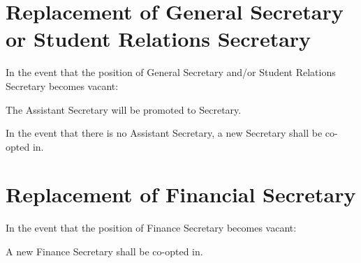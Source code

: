 \section{Replacement of General Secretary or Student Relations Secretary}
In the event that the position of General Secretary and/or Student Relations Secretary becomes vacant:
	\begin{legal}
	\item The Assistant Secretary will be promoted to Secretary.
	\item In the event that there is no Assistant Secretary, a new Secretary shall be co-opted in.
	\end{legal}

\section{Replacement of Financial Secretary}
In the event that the position of Finance Secretary becomes vacant:
	\begin{legal}
	\item A new Finance Secretary shall be co-opted in.
	\end{legal}